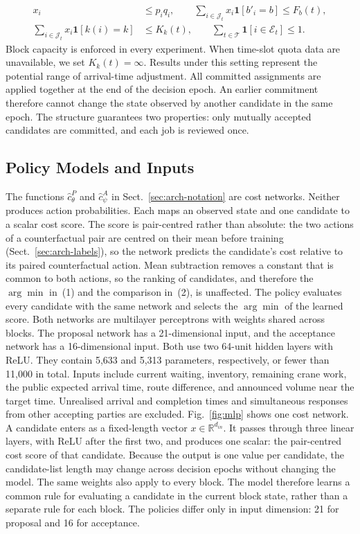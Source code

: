 \begin{equation}
\begin{aligned}
x_i&\le p_iq_i,\qquad
\sum_{i\in\mathcal J_t}\!x_i\mathbf1[b'_i\!=\!b]\le F_b(t),\\
\sum_{i\in\mathcal J_t}\!x_i\mathbf1[k(i)\!=\!k]&\le K_k(t),\qquad
\sum_{t\in\mathcal T}\!\mathbf1[i\in\mathcal E_t]\le1.
\end{aligned}
\end{equation}
Block capacity is enforced in every experiment. When time-slot quota
data are unavailable, we set $K_k(t)=\infty$. Results under this setting
represent the potential range of arrival-time adjustment. All committed
assignments are applied together at the end of the decision epoch. An
earlier commitment therefore cannot change the state observed by another
candidate in the same epoch. The structure guarantees two properties:
only mutually accepted candidates are committed, and each job is
reviewed once.

\subsection{Policy Models and Inputs}
\label{sec:arch-models}
The functions $\hat c^{P}_{\theta}$ and $\hat c^{A}_{\psi}$ in
Sect.~\ref{sec:arch-notation} are cost networks. Neither produces action
probabilities. Each maps an observed state and one candidate to a scalar
cost score. The score is pair-centred rather than absolute: the two
actions of a counterfactual pair are centred on their mean before
training (Sect.~\ref{sec:arch-labels}), so the network predicts the
candidate's cost relative to its paired counterfactual action. Mean
subtraction removes a constant that is common to both actions, so the
ranking of candidates, and therefore the $\arg\min$ in~(1) and the
comparison in~(2), is unaffected. The policy evaluates every candidate
with the same network and selects the $\arg\min$ of the learned score. Both networks are multilayer perceptrons with weights
shared across blocks. The proposal network has a 21-dimensional input,
and the acceptance network has a 16-dimensional input. Both use two
64-unit hidden layers with ReLU. They contain 5{,}633 and 5{,}313
parameters, respectively, or fewer than 11{,}000 in total. Inputs
include current waiting, inventory, remaining crane work, the public
expected arrival time, route difference, and announced volume near the
target time. Unrealised arrival and completion times and simultaneous
responses from other accepting parties are excluded.
Fig.~\ref{fig:mlp} shows one cost network. A candidate enters as a
fixed-length vector $x\in\mathbb R^{d_{in}}$. It passes through three
linear layers, with ReLU after the first two, and produces one scalar:
the pair-centred cost score of that candidate. Because the output is
one value per candidate, the candidate-list length may change across
decision epochs without changing the model. The same weights also apply
to every block. The model therefore learns a common rule for evaluating
a candidate in the current block state, rather than a separate rule for
each block. The policies differ only in input dimension: 21 for proposal
and 16 for acceptance.

